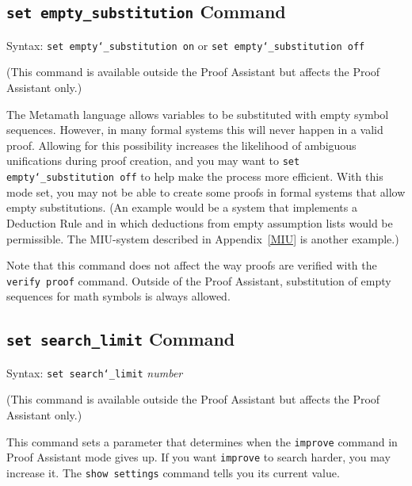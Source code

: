 \subsection{\texttt{set empty\_substitution} Command}
\begin{flushleft}
Syntax:  \texttt{set empty{\char`\_}substitution on} or \texttt{set
empty{\char`\_}substitution off}
\end{flushleft}

(This command is available outside the Proof Assistant but affects the
Proof Assistant only.)

The Metamath language allows variables to be
substituted
with empty symbol sequences.  However, in many
formal systems this will never happen in a valid
proof.  Allowing for this possibility increases the likelihood of
ambiguous unifications during proof creation, and you
may want to \texttt{set empty{\char`\_}substitution off} to help make
the process more efficient.  With this mode set, you may not be able to
create some proofs in formal systems that allow empty substitutions.
(An example would be a system that implements a Deduction Rule and in
which deductions from empty assumption lists would be permissible.  The
MIU-system described in Appendix~\ref{MIU} is another
example.)

Note that this command does not affect the way proofs are verified with
the \texttt{verify proof} command.  Outside of the Proof Assistant,
substitution of empty sequences for math symbols is always allowed.



\subsection{\texttt{set search\_limit} Command} Syntax:  \texttt{set search{\char`\_}limit} {\em
number}

(This command is available outside the Proof Assistant but affects the
Proof Assistant only.)

This command sets a parameter that determines when the \texttt{improve} command
in Proof Assistant mode gives up.  If you want \texttt{improve} to search harder,
you may increase it.  The \texttt{show settings} command tells you its current
value.


